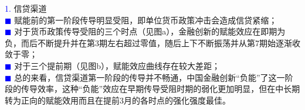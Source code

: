 \documentclass[12pt,aspectratio=169]{ctexbeamer}
\begin{document}
\begin{frame}
					\textcolor{blue}{\footnotesize 1.} {\normalsize 信贷渠道}\\
					\justifying
					\footnotesize
					\hspace{2em}
					\textcolor{blue}{\tiny $\blacksquare$} 赋能前的第一阶段传导明显受阻，即单位货币政策冲击会造成信贷紧缩；\\
					\hspace{2em}
					\textcolor{blue}{\tiny $\blacksquare$} 对于货币政策传导受阻的三个时点（见图a），金融创新的赋能效应在即期为负，而后不断提升并在第3期左右超过零值，随后上下不断振荡并从第7期始逐渐收敛于零；\\
					\hspace{2em}
					\textcolor{blue}{\tiny $\blacksquare$} 对于三个提前期（见图b），赋能效应曲线存在较大差距；\\
					\hspace{2em}
					\textcolor{blue}{\tiny $\blacksquare$} 总的来看，信贷渠道第一阶段的传导并不畅通，中国金融创新“负能”了这一阶段的传导效率，这种“负能”效应在早期传导受阻时期的弱化更加明显，但在中长期转为正向的赋能效用而且在提前3月的各时点的强化强度最佳。
			\end{frame}
\end{document}

